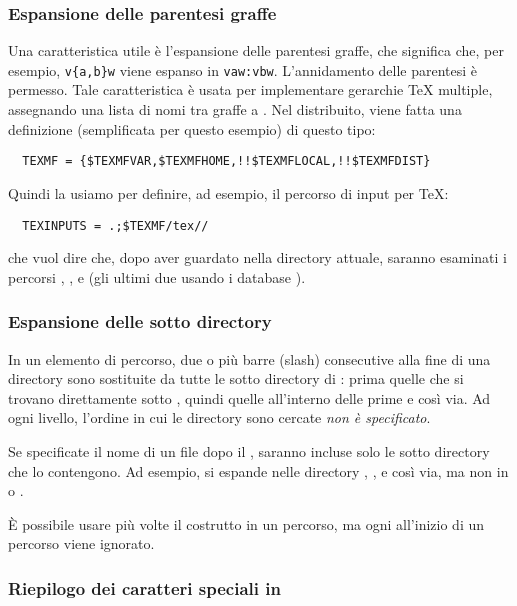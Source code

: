 \documentclass{article}
\begin{document}
\subsubsection{Espansione delle parentesi graffe}
\label{sec:brace-expansion}

Una caratteristica utile è l'espansione delle parentesi graffe, che
significa che, per esempio, \verb+v{a,b}w+ viene espanso in
\verb+vaw:vbw+. L'annidamento delle parentesi è permesso. Tale
caratteristica è usata per implementare gerarchie \TeX{} multiple,
assegnando una lista di nomi tra graffe a .
Nel  distribuito, viene fatta una definizione
(semplificata per questo esempio) di questo tipo:
\begin{verbatim}
  TEXMF = {$TEXMFVAR,$TEXMFHOME,!!$TEXMFLOCAL,!!$TEXMFDIST}
\end{verbatim}
Quindi la usiamo per definire, ad esempio, il percorso di input per \TeX:
\begin{verbatim}
  TEXINPUTS = .;$TEXMF/tex//
\end{verbatim}
che vuol dire che, dopo aver guardato nella directory attuale, saranno
esaminati i percorsi , ,
 e  (gli ultimi due usando i
database ).

\subsubsection{Espansione delle sotto directory}
\label{sec:subdirectory-expansion}

In un elemento di percorso, due o più barre (slash) consecutive alla fine
di una directory  sono sostituite da tutte le sotto directory di
: prima quelle che si trovano direttamente sotto , quindi
quelle all'interno delle prime e così via. Ad ogni livello, l'ordine in
cui le directory sono cercate \emph{non è specificato}.

Se specificate il nome di un file dopo il \samp{//}, saranno incluse solo
le sotto directory che lo contengono. Ad esempio,  si
espande nelle directory , ,  e
così via, ma non in  o .

È possibile usare più volte il costrutto \samp{//} in un percorso, ma ogni
\samp{//} all'inizio di un percorso viene ignorato.

\subsubsection{Riepilogo dei caratteri speciali in }
\label{sec:cnf-special-chars}
\end{document}
